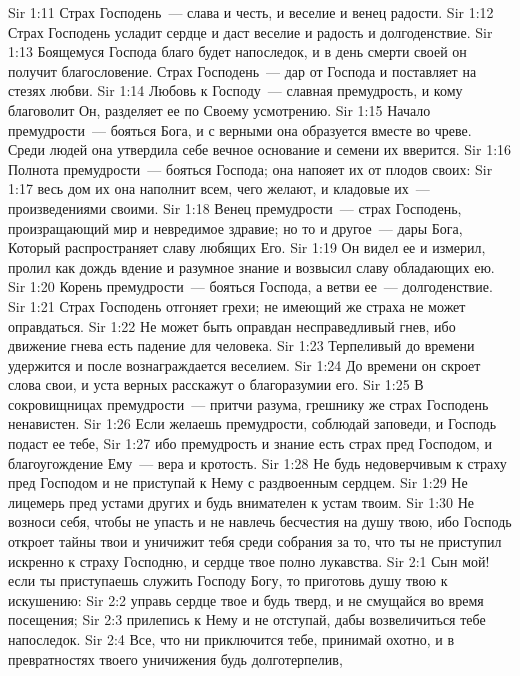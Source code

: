 \vs Sir 1:11 Страх Господень~--- слава и честь, и веселие и венец радости.
\vs Sir 1:12 Страх Господень усладит сердце и даст веселие и радость и долгоденствие.
\vs Sir 1:13 Боящемуся Господа благо будет напоследок, и в день смерти своей он получит благословение. Страх Господень~--- дар от Господа и поставляет на стезях любви.
\vs Sir 1:14 Любовь к Господу~--- славная премудрость, и кому благоволит Он, разделяет ее по Своему усмотрению.
\vs Sir 1:15 Начало премудрости~--- бояться Бога, и с верными она образуется вместе во чреве. Среди людей она утвердила себе вечное основание и семени их вверится.
\vs Sir 1:16 Полнота премудрости~--- бояться Господа; она напояет их от плодов своих:
\vs Sir 1:17 весь дом их она наполнит всем, чего желают, и кладовые их~--- произведениями своими.
\vs Sir 1:18 Венец премудрости~--- страх Господень, произращающий мир и невредимое здравие; но то и другое~--- дары Бога, Который распространяет славу любящих Его.
\vs Sir 1:19 Он видел ее и измерил, пролил как дождь вдение и разумное знание и возвысил славу обладающих ею.
\vs Sir 1:20 Корень премудрости~--- бояться Господа, а ветви ее~--- долгоденствие.
\rsbpar\vs Sir 1:21 Страх Господень отгоняет грехи; не имеющий же страха не может оправдаться.
\vs Sir 1:22 Не может быть оправдан несправедливый гнев, ибо  движение гнева есть падение для человека.
\vs Sir 1:23 Терпеливый до времени удержится и после вознаграждается веселием.
\vs Sir 1:24 До времени он скроет слова свои, и уста верных расскажут о благоразумии его.
\vs Sir 1:25 В сокровищницах премудрости~--- притчи разума, грешнику же страх Господень ненавистен.
\vs Sir 1:26 Если желаешь премудрости, соблюдай заповеди, и Господь подаст ее тебе,
\vs Sir 1:27 ибо премудрость и знание есть страх пред Господом, и благоугождение Ему~--- вера и кротость.
\vs Sir 1:28 Не будь недоверчивым к страху пред Господом и не приступай к Нему с раздвоенным сердцем.
\vs Sir 1:29 Не лицемерь пред устами других и будь внимателен к устам твоим.
\vs Sir 1:30 Не возноси себя, чтобы не упасть и не навлечь бесчестия на душу твою, ибо Господь откроет тайны твои и уничижит тебя среди собрания за то, что ты не приступил искренно к страху Господню, и сердце твое полно лукавства.
\vs Sir 2:1 Сын мой! если ты приступаешь служить Господу Богу, то приготовь душу твою к искушению:
\vs Sir 2:2 управь сердце твое и будь тверд, и не смущайся во время посещения;
\vs Sir 2:3 прилепись к Нему и не отступай, дабы возвеличиться тебе напоследок.
\vs Sir 2:4 Все, что ни приключится тебе, принимай охотно, и в превратностях твоего уничижения будь долготерпелив,
